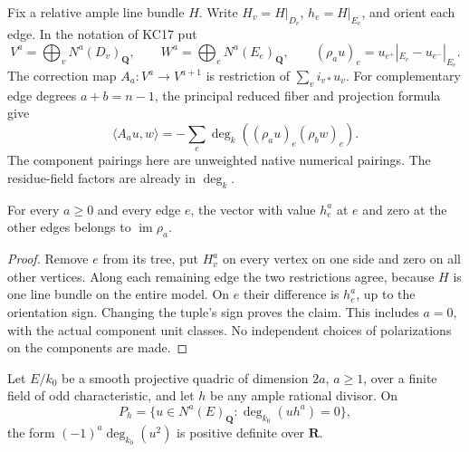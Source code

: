 Fix a relative ample line bundle $H$.  Write $H_v=H|_{D_v}$,
$h_e=H|_{E_e}$, and orient each edge.  In the notation of KC17 put
\[
 V^a=\bigoplus_vN^a(D_v)_{\mathbf Q},\qquad
 W^a=\bigoplus_eN^a(E_e)_{\mathbf Q},\qquad
 (\rho_a u)_e=u_{e^+}|_{E_e}-u_{e^-}|_{E_e}.
 \tag{QF17.1}\label{r17qf:rho}
\]
The correction map $A_a:V^a\to V^{a+1}$ is restriction of
$\sum_vi_{v*}u_v$.  For complementary edge degrees $a+b=n-1$,
the principal reduced fiber and projection formula give
\[
 \langle A_a u,w\rangle
       =-\sum_e\deg_k((\rho_a u)_e(\rho_b w)_e).
 \tag{QF17.2}\label{r17qf:adjoint}
\]
The component pairings here are unweighted native numerical
pairings.  The residue-field factors are already in $\deg_k$.

\begin{lemma}
\label{r17qf:edge-powers}
For every $a\ge0$ and every edge $e$, the vector with value
$h_e^a$ at $e$ and zero at the other edges belongs to
$\operatorname{im}\rho_a$.
\end{lemma}

\begin{proof}
Remove $e$ from its tree, put $H_v^a$ on every vertex on one
side and zero on all other vertices.  Along each remaining edge
the two restrictions agree, because $H$ is one line bundle on
the entire model.  On $e$ their difference is $h_e^a$, up to
the orientation sign.  Changing the tuple's sign proves the
claim.  This includes $a=0$, with the actual component unit
classes.  No independent choices of polarizations on the
components are made.
\end{proof}

\begin{lemma}
\label{r17qf:middle-form}
Let $E/k_0$ be a smooth projective quadric of dimension $2a$,
$a\ge1$, over a finite field of odd characteristic, and let
$h$ be any ample rational divisor.  On
\[
       P_h=\{u\in N^a(E)_{\mathbf Q}:\deg_{k_0}(u h^a)=0\},
\]
the form $(-1)^a\deg_{k_0}(u^2)$ is positive definite over
$\mathbf R$.
\end{lemma}

